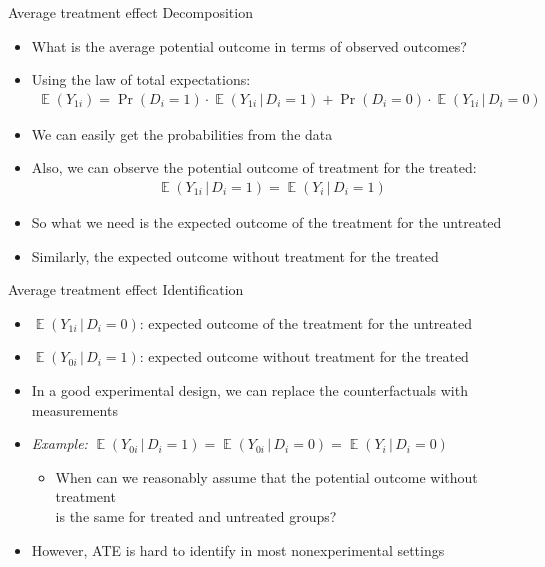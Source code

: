 \documentclass[aspectratio=169,compress,handout,t,xcolor=table]{beamer}
\DeclareMathOperator{\E}{\mathbb{E}}                       %
\begin{document}
\begin{frame}{Average treatment effect \hspace{0pt plus 1 filll} \large Decomposition}
  \begin{itemize}
    \item What is the average potential outcome in terms of observed outcomes?
    \item Using the law of total expectations:
    \begin{align*}
      \E(Y_{1i}) = \Pr (D_i=1) \cdot \E(Y_{1i} \, | \, D_i=1) + \Pr (D_i=0) \cdot \E(Y_{1i} \, | \, D_i=0)
    \end{align*}
    \item We can easily get the probabilities from the data
    \item Also, we can observe the potential outcome of treatment for the treated:
    \begin{align*}
      \E(Y_{1i} \, | \, D_i=1) = \E(Y_{i} \, | \, D_i=1)
    \end{align*}
    \item So what we need is the expected outcome of the treatment for the untreated
    \item Similarly, the expected outcome without treatment for the treated
  \end{itemize}
\end{frame}

\begin{frame}{Average treatment effect \hspace{0pt plus 1 filll} \large Identification}
  \begin{itemize}
    \item \(\E(Y_{1i} \, | \, D_i = 0)\): expected outcome of the treatment for the untreated
    \item \(\E(Y_{0i} \, | \, D_i = 1)\): expected outcome without treatment for the treated
    \item In a good experimental design, we can replace the counterfactuals with measurements
    \item \emph{Example:} \(\E(Y_{0i} \, | \, D_i = 1) = \E(Y_{0i} \, | \, D_i = 0) = \E(Y_{i} \, | \, D_i = 0)\)
    \begin{itemize}
      \item When can we reasonably assume that the potential outcome without treatment \\ is the same for treated and untreated groups?
    \end{itemize}
    \item However, ATE is hard to identify in most nonexperimental settings
  \end{itemize}
\end{frame}
\end{document}
